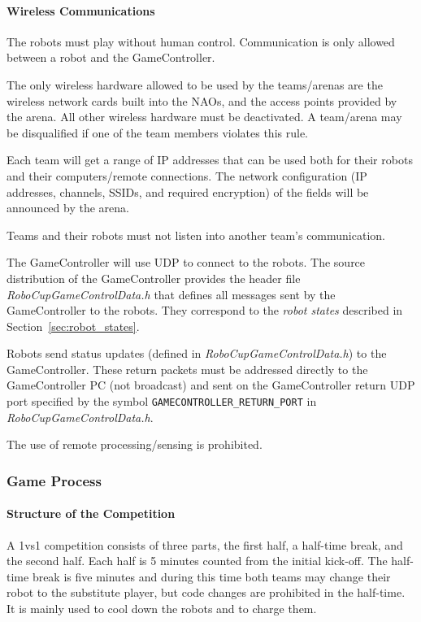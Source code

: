 \paragraph{Wireless Communications}
\label{sec:wireless}
The robots must play without human control. Communication is only allowed between a robot and the GameController.

The only wireless hardware allowed to be used by the teams/arenas are the wireless network cards built into the NAOs, and the access points provided by the arena. All other wireless hardware must be deactivated. A team/arena may be disqualified if one of the team members violates this rule.

Each team will get a range of IP addresses that can be used both for their robots and their computers/remote connections. The network configuration (\eg IP addresses, channels, SSIDs, and required encryption) of the fields will be announced by the arena. 


Teams and their robots must not listen into another team's communication.

The GameController will use UDP to connect to the robots. The source distribution of the GameController provides the header file \emph{RoboCupGameControlData.h} that defines all messages sent by the GameController to the robots. They correspond to the \emph{robot states} described in Section~\ref{sec:robot_states}.

Robots send status updates (defined in \emph{RoboCupGameControlData.h}) to the GameController. These return packets must be addressed directly to the GameController PC (\ie not broadcast) and sent on the GameController return UDP port specified by the symbol \verb!GAMECONTROLLER_RETURN_PORT! in \emph{RoboCupGameControlData.h}.

The use of remote processing/sensing is prohibited.

\newpage

\subsubsection{Game Process}
\label{sec:game_process}

\paragraph{Structure of the Competition}
\label{sec:game_struct}

A 1vs1 competition consists of three parts, the first half, a half-time break, and the second half. Each half is 5 minutes counted from the initial kick-off.
The half-time break is five minutes and during this time both teams may change their robot to the substitute player, but code changes are prohibited in the half-time. It is mainly used to cool down the robots and to charge them. 

